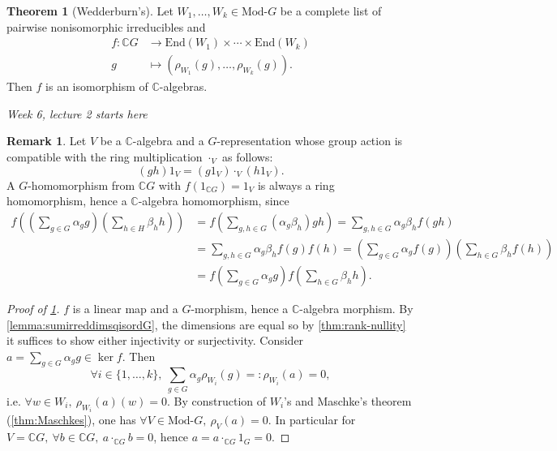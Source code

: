 \documentclass{article}
\newcommand{\C}{\mathbb{C}}
\newcommand{\End}{\text{End}}
\newcommand{\Mod}{\text{Mod-}}
\theoremstyle{definition}
\newtheorem{thm}[defn]{Theorem}
\newtheorem*{remark}{Remark}
\begin{document}
\begin{thm}[Wedderburn's]
\label{thm:Wedderburns}
Let $W_1,\ldots,W_k\in\Mod G$ be a complete list of pairwise nonisomorphic irreducibles and
\[
\begin{aligned}
f:\C G&\rightarrow\End(W_1)\times\cdots\times\End(W_k)\\
g&\mapsto \left(\rho_{W_1}(g),\ldots,\rho_{W_k}(g)\right).
\end{aligned}
\]
Then $f$ is an isomorphism of $\C$-algebras.
\end{thm}

\begin{flushright}
\textit{Week 6, lecture 2 starts here}
\end{flushright}

\begin{remark}
Let $V$ be a $\C$-algebra and a $G$-representation whose group action is compatible with the ring multiplication $\cdot_V$ as follows:
\[
(gh)1_V=(g1_V)\cdot_V(h1_V).
\]
A $G$-homomorphism from $\C G$ with $f(1_{\C G})=1_V$ is always a ring homomorphism, hence a $\C$-algebra homomorphism, since
\[
\begin{aligned}
f\left(\left(\sum_{g\in G}\alpha_g g\right)\left(\sum_{h\in H}\beta_h h\right)\right)&=f\left(\sum_{g,h\in G}(\alpha_g\beta_h)gh\right)=\sum_{g,h\in G}\alpha_g\beta_h f(gh)\\
&=\sum_{g,h\in G}\alpha_g\beta_h f(g)f(h)=\left(\sum_{g\in G}\alpha_g f(g)\right)\left(\sum_{h\in G}\beta_h f(h)\right)\\
&=f\left(\sum_{g\in G}\alpha_g g\right)f\left(\sum_{h\in G}\beta_h h\right).
\end{aligned}
\]
\end{remark}

\begin{proof}[Proof of \ref{thm:Wedderburns}]
$f$ is a linear map and a $G$-morphism, hence a $\C$-algebra morphism. By \ref{lemma:sumirreddimsqisordG}, the dimensions are equal so by \ref{thm:rank-nullity} it suffices to show either injectivity or surjectivity. Consider $\displaystyle a=\sum_{g\in G}\alpha_g g\in\ker f$. Then
\[
\forall i\in\{1,\ldots,k\},\ \sum_{g\in G}\alpha_g\rho_{W_i}(g)=:\rho_{W_i}(a)=0,
\]
i.e. $\forall w\in W_i,\ \rho_{W_i}(a)(w)=0$. By construction of $W_i$'s and Maschke's theorem (\ref{thm:Maschkes}), one has $\forall V\in\Mod G,\ \rho_V(a)=0$. In particular for $V=\C G,\ \forall b\in\C G,\ a\cdot_{\C G}b=0$, hence $a=a\cdot_{\C G}1_G=0$.
\end{proof}
\end{document}
